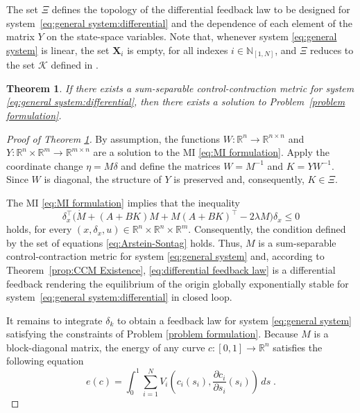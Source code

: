 \documentclass[10pt,twocolumn,twoside]{IEEEtran}
\theoremstyle{plain}
\newtheorem{theorem}{Theorem}
\theoremstyle{definition}
\theoremstyle{remark}
\begin{document}
The set $\Xi$ defines the topology of the differential feedback law to be designed for system~\eqref{eq:general system:differential} and the dependence of each element of the matrix $Y$ on the state-space variables. Note that, whenever system \eqref{eq:general system} is linear, the set $\mathbf{X}_i$ is empty, for all indexes $i\in\mathbb{N}_{[1,N]}$, and $\Xi$ reduces to the set $\mathcal{K}$ defined in \cite{Tanaka2011}.

\begin{theorem}\label{thm:main result}
	If there exists a sum-separable control-contraction metric for system \eqref{eq:general system:differential}, then there exists a solution to Problem~\ref{problem formulation}.
\end{theorem}

\begin{proof}[Proof of Theorem \ref{thm:main result}]
	By assumption, the functions $W:\mathbb{R}^n\to\mathbb{R}^{n\times n}$ and $Y:\mathbb{R}^n\times\mathbb{R}^m\to\mathbb{R}^{m\times n}$ are a solution to the MI \eqref{eq:MI formulation}. Apply the coordinate change $\eta=M\delta$ and define the matrices $W=M^{-1}$ and $K=YW^{-1}$. Since $W$ is diagonal, the structure of $Y$ is preserved and, consequently, $K\in\Xi$.
	
	The MI \eqref{eq:MI formulation} implies that the inequality
	\begin{equation*}
		\delta_x^\top\bigg(\dot{M}+(A+BK)M+M(A+BK)^\top-2\lambda M\bigg)\delta_x\leq0
	\end{equation*}
	holds, for every $(x,\delta_x,u)\in\mathbb{R}^n\times\mathbb{R}^n\times\mathbb{R}^m$. Consequently, the condition defined by the set of equations \eqref{eq:Arstein-Sontag} holds. Thus, $M$ is a sum-separable control-contraction metric for system \eqref{eq:general system} and, according to Theorem~\ref{prop:CCM Existence}, \eqref{eq:differential feedback law} is a differential feedback rendering the equilibrium of the origin globally exponentially stable for system~\eqref{eq:general system:differential} in closed loop.
	
	
	
	It remains to integrate $\delta_k$ to obtain a feedback law for system \eqref{eq:general system} satisfying the constraints of Problem \ref{problem formulation}. Because $M$ is a block-diagonal matrix, the energy of any curve $c:[0,1]\to\mathbb{R}^n$ satisfies the following equation
	\begin{equation}\label{eq:geodesic sum}
		e(c)=\int_0^1\sum_{i=1}^N V_i\left(c_i(s_i),\frac{\partial c_i}{\partial s_i}(s_i)\right)\,ds\;.
	\end{equation}


\end{proof}
\end{document}

